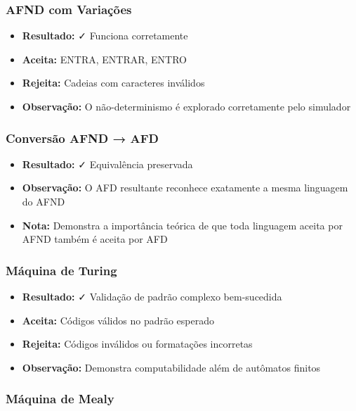 \documentclass[12pt,a4paper]{article}
\begin{document}
\subsubsection{AFND com Variações}

\begin{itemize}
    \item \textbf{Resultado:} ✓ Funciona corretamente
    \item \textbf{Aceita:} ENTRA, ENTRAR, ENTRO
    \item \textbf{Rejeita:} Cadeias com caracteres inválidos
    \item \textbf{Observação:} O não-determinismo é explorado corretamente pelo simulador
\end{itemize}

\subsubsection{Conversão AFND → AFD}

\begin{itemize}
    \item \textbf{Resultado:} ✓ Equivalência preservada
    \item \textbf{Observação:} O AFD resultante reconhece exatamente a mesma linguagem do AFND
    \item \textbf{Nota:} Demonstra a importância teórica de que toda linguagem aceita por AFND também é aceita por AFD
\end{itemize}

\subsubsection{Máquina de Turing}

\begin{itemize}
    \item \textbf{Resultado:} ✓ Validação de padrão complexo bem-sucedida
    \item \textbf{Aceita:} Códigos válidos no padrão esperado
    \item \textbf{Rejeita:} Códigos inválidos ou formatações incorretas
    \item \textbf{Observação:} Demonstra computabilidade além de autômatos finitos
\end{itemize}

\subsubsection{Máquina de Mealy}
\end{document}
